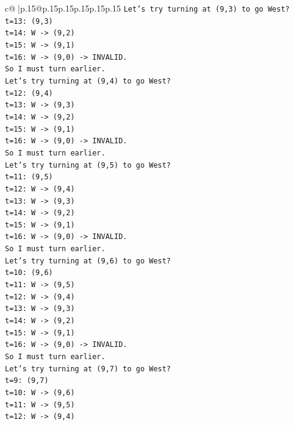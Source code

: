 \documentclass{article}
\begin{document}
{\begin{supertabular}{c@{$\;$}|p{.15\linewidth}@{}p{.15\linewidth}p{.15\linewidth}p{.15\linewidth}p{.15\linewidth}p{.15\linewidth}}
{{{\texttt{Let's try turning at (9,3) to go West?} \\
\texttt{t=13: (9,3)} \\
\texttt{t=14: W {-}> (9,2)} \\
\texttt{t=15: W {-}> (9,1)} \\
\texttt{t=16: W {-}> (9,0) {-}> INVALID.} \\
\texttt{So I must turn earlier.} \\
\texttt{Let's try turning at (9,4) to go West?} \\
\texttt{t=12: (9,4)} \\
\texttt{t=13: W {-}> (9,3)} \\
\texttt{t=14: W {-}> (9,2)} \\
\texttt{t=15: W {-}> (9,1)} \\
\texttt{t=16: W {-}> (9,0) {-}> INVALID.} \\
\texttt{So I must turn earlier.} \\
\texttt{Let's try turning at (9,5) to go West?} \\
\texttt{t=11: (9,5)} \\
\texttt{t=12: W {-}> (9,4)} \\
\texttt{t=13: W {-}> (9,3)} \\
\texttt{t=14: W {-}> (9,2)} \\
\texttt{t=15: W {-}> (9,1)} \\
\texttt{t=16: W {-}> (9,0) {-}> INVALID.} \\
\texttt{So I must turn earlier.} \\
\texttt{Let's try turning at (9,6) to go West?} \\
\texttt{t=10: (9,6)} \\
\texttt{t=11: W {-}> (9,5)} \\
\texttt{t=12: W {-}> (9,4)} \\
\texttt{t=13: W {-}> (9,3)} \\
\texttt{t=14: W {-}> (9,2)} \\
\texttt{t=15: W {-}> (9,1)} \\
\texttt{t=16: W {-}> (9,0) {-}> INVALID.} \\
\texttt{So I must turn earlier.} \\
\texttt{Let's try turning at (9,7) to go West?} \\
\texttt{t=9: (9,7)} \\
\texttt{t=10: W {-}> (9,6)} \\
\texttt{t=11: W {-}> (9,5)} \\
\texttt{t=12: W {-}> (9,4)} \\
}}}
\end{supertabular}}
\end{document}

